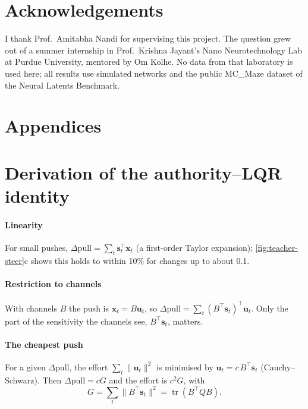 \documentclass[11pt,a4paper]{article}
\newcommand{\vect}[1]{\bm{#1}}
\newcommand{\tr}{\operatorname{tr}}
\newcommand{\pull}{\mathrm{pull}}
\begin{document}
\section*{Acknowledgements}
I thank Prof.\ Amitabha Nandi for supervising this project. The question grew out of a summer internship in Prof.\ Krishna Jayant's Nano Neurotechnology Lab at Purdue University, mentored by Om Kolhe. No data from that laboratory is used here; all results use simulated networks and the public MC\_Maze dataset of the Neural Latents Benchmark.




\clearpage
\appendix
\section*{Appendices}

\section{Derivation of the authority--LQR identity}\label{app:derivation}

\paragraph{Linearity} For small pushes, $\Delta\pull = \sum_t \vect s_t^\top \vect x_t$ (a first-order Taylor expansion); \cref{fig:teacher-steer}c shows this holds to within 10\% for changes up to about 0.1.

\paragraph{Restriction to channels} With channels $B$ the push is $\vect x_t = B\vect u_t$, so $\Delta\pull = \sum_t (B^\top \vect s_t)^\top \vect u_t$. Only the part of the sensitivity the channels see, $B^\top\vect s_t$, matters.

\paragraph{The cheapest push} For a given $\Delta\pull$, the effort $\sum_t\lVert\vect u_t\rVert^2$ is minimised by $\vect u_t = c\,B^\top\vect s_t$ (Cauchy--Schwarz). Then $\Delta\pull = cG$ and the effort is $c^2G$, with
\begin{equation}
  G = \sum_t \lVert B^\top\vect s_t\rVert^2 = \tr(B^\top Q B).
\end{equation}
\end{document}
